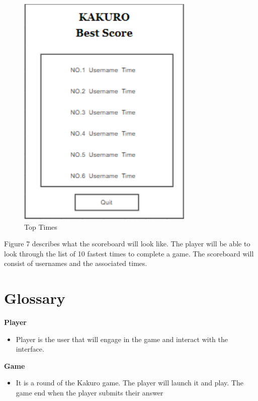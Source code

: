 \documentclass[12pt]{article}
\begin{document}
\begin{figure}[htbp]
    \centering
    \includegraphics[scale=0.8]{UI-4.png}
    \caption{Top Times}
    \label{fig:UI-4}
\end{figure}

Figure 7 describes what the scoreboard will look like. The player will be able to look through the list of 10 fastest times to complete a game. The scoreboard will consist of usernames and the associated times.

\newpage

\section{Glossary}

\textbf{Player}
\vspace{5mm}
\begin{itemize}
   \item Player is the user that will engage in the game and interact with the interface.
\end{itemize}

\vspace{5mm}

\textbf{Game}
\vspace{5mm}
\begin{itemize}
   \item It is a round of the Kakuro game. The player will launch it and play. The game end when the player submits  their answer
\end{itemize}
\end{document}
